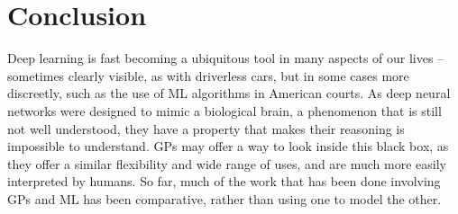 
\section{Conclusion}

Deep learning is fast becoming a ubiquitous tool in many aspects of our lives -- sometimes clearly visible, as with driverless cars, but in some cases more discreetly, such as the use of ML algorithms in American courts.
As deep neural networks were designed to mimic a biological brain, a phenomenon that is still not well understood, they have a  property that makes their reasoning is impossible to understand.
\acp{GP} may offer a way to look inside this black box, as they offer a similar flexibility and wide range of uses, and are much more easily interpreted by humans.
So far, much of the work that has been done involving \acp{GP} and ML has been comparative, rather than using one to model the other.
